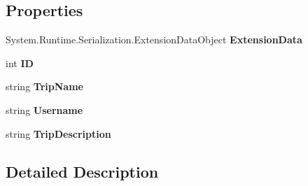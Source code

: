 \subsection*{Properties}
\begin{DoxyCompactItemize}
\item 
\hypertarget{class_tripi_w_c_f_1_1_client_mockup_1_1_proxy_1_1_trip_af8805aaaf888e213cbbc94181200be05}{
System.Runtime.Serialization.ExtensionDataObject {\bfseries ExtensionData}}
\label{class_tripi_w_c_f_1_1_client_mockup_1_1_proxy_1_1_trip_af8805aaaf888e213cbbc94181200be05}

\item 
\hypertarget{class_tripi_w_c_f_1_1_client_mockup_1_1_proxy_1_1_trip_abe6972fc612a3749b72c1c12661cc8ad}{
int {\bfseries ID}}
\label{class_tripi_w_c_f_1_1_client_mockup_1_1_proxy_1_1_trip_abe6972fc612a3749b72c1c12661cc8ad}

\item 
\hypertarget{class_tripi_w_c_f_1_1_client_mockup_1_1_proxy_1_1_trip_ab3178ccd1a3906add6132cd72668c11e}{
string {\bfseries TripName}}
\label{class_tripi_w_c_f_1_1_client_mockup_1_1_proxy_1_1_trip_ab3178ccd1a3906add6132cd72668c11e}

\item 
\hypertarget{class_tripi_w_c_f_1_1_client_mockup_1_1_proxy_1_1_trip_adb6f9c38b858cf4101e9325f08bbd4ec}{
string {\bfseries Username}}
\label{class_tripi_w_c_f_1_1_client_mockup_1_1_proxy_1_1_trip_adb6f9c38b858cf4101e9325f08bbd4ec}

\item 
\hypertarget{class_tripi_w_c_f_1_1_client_mockup_1_1_proxy_1_1_trip_aa475109330f8c1f06f1b923fdeb792d8}{
string {\bfseries TripDescription}}
\label{class_tripi_w_c_f_1_1_client_mockup_1_1_proxy_1_1_trip_aa475109330f8c1f06f1b923fdeb792d8}

\end{DoxyCompactItemize}


\subsection{Detailed Description}


